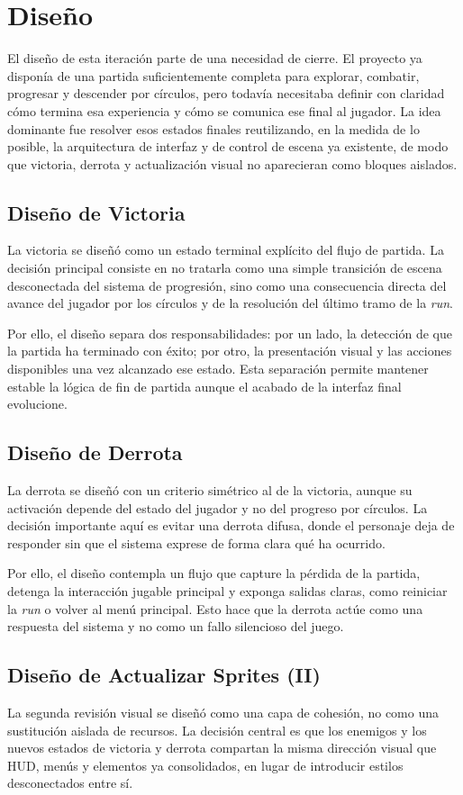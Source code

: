 \section{Diseño}
El diseño de esta iteración parte de una necesidad de cierre. El proyecto ya disponía de una
partida suficientemente completa para explorar, combatir, progresar y descender por círculos,
pero todavía necesitaba definir con claridad cómo termina esa experiencia y cómo se comunica
ese final al jugador. La idea dominante fue resolver esos estados finales reutilizando, en la
medida de lo posible, la arquitectura de interfaz y de control de escena ya existente, de
modo que victoria, derrota y actualización visual no aparecieran como bloques aislados.

\subsection{Diseño de Victoria}
La victoria se diseñó como un estado terminal explícito del flujo de partida. La decisión
principal consiste en no tratarla como una simple transición de escena desconectada del
sistema de progresión, sino como una consecuencia directa del avance del jugador por los
círculos y de la resolución del último tramo de la \textit{run}.

Por ello, el diseño separa dos responsabilidades: por un lado, la detección de que la partida
ha terminado con éxito; por otro, la presentación visual y las acciones disponibles una vez
alcanzado ese estado. Esta separación permite mantener estable la lógica de fin de partida
aunque el acabado de la interfaz final evolucione.

\subsection{Diseño de Derrota}
La derrota se diseñó con un criterio simétrico al de la victoria, aunque su activación
depende del estado del jugador y no del progreso por círculos. La decisión importante aquí es
evitar una derrota difusa, donde el personaje deja de responder sin que el sistema exprese de
forma clara qué ha ocurrido.

Por ello, el diseño contempla un flujo que capture la pérdida de la partida, detenga la
interacción jugable principal y exponga salidas claras, como reiniciar la \textit{run} o
volver al menú principal. Esto hace que la derrota actúe como una respuesta del sistema y no
como un fallo silencioso del juego.

\subsection{Diseño de Actualizar Sprites (II)}
La segunda revisión visual se diseñó como una capa de cohesión, no como una sustitución
aislada de recursos. La decisión central es que los enemigos y los nuevos estados de victoria
y derrota compartan la misma dirección visual que HUD, menús y elementos ya consolidados, en
lugar de introducir estilos desconectados entre sí.


